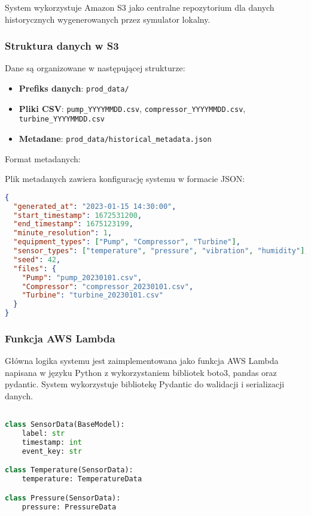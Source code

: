 System wykorzystuje Amazon S3 jako centralne repozytorium dla danych historycznych wygenerowanych przez symulator lokalny.

\subsubsection{Struktura danych w S3}

Dane są organizowane w następującej strukturze:

\begin{itemize}
    \item \textbf{Prefiks danych}: \texttt{prod\_data/}
    \item \textbf{Pliki CSV}: \texttt{pump\_YYYYMMDD.csv}, \texttt{compressor\_YYYYMMDD.csv}, \texttt{turbine\_YYYYMMDD.csv}
    \item \textbf{Metadane}: \texttt{prod\_data/historical\_metadata.json}
\end{itemize}

Format metadanych:

Plik metadanych zawiera konfigurację systemu w formacie JSON:

\begin{lstlisting}[language=JSON, caption=Plik metadanych]
{
  "generated_at": "2023-01-15 14:30:00",
  "start_timestamp": 1672531200,
  "end_timestamp": 1675123199,
  "minute_resolution": 1,
  "equipment_types": ["Pump", "Compressor", "Turbine"],
  "sensor_types": ["temperature", "pressure", "vibration", "humidity"],
  "seed": 42,
  "files": {
    "Pump": "pump_20230101.csv",
    "Compressor": "compressor_20230101.csv", 
    "Turbine": "turbine_20230101.csv"
  }
}
\end{lstlisting}

\subsubsection{Funkcja AWS Lambda}
\label{subsec:aws_lambda}

Główna logika systemu jest zaimplementowana jako funkcja AWS Lambda napisana w języku Python z wykorzystaniem bibliotek boto3, pandas oraz pydantic. System wykorzystuje bibliotekę Pydantic do walidacji i serializacji danych.

\begin{lstlisting}[language=Python, caption=Klasy modeli danych]

class SensorData(BaseModel):
    label: str
    timestamp: int
    event_key: str

class Temperature(SensorData):
    temperature: TemperatureData

class Pressure(SensorData):
    pressure: PressureData

\end{lstlisting}

